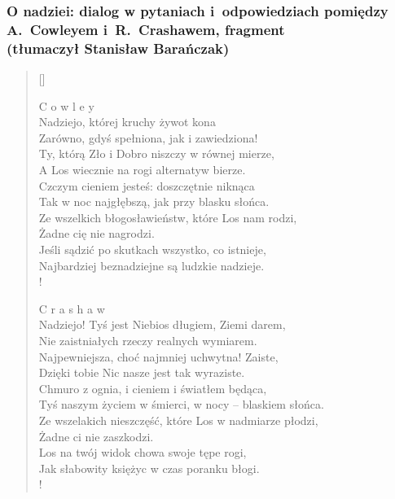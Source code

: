 \documentclass[10pt,t]{beamer}
\begin{document}
\begin{frame}
  \frametitle{O nadziei: dialog w pytaniach i~odpowiedziach pomiędzy \\
    A.~Cowleyem i~R.~Crashawem, fragment \\
    (tłumaczył Stanisław
    Barańczak)}

  \settowidth{\versewidth}{Zarówno, gdyś spełniona, jak i
    zawiedziona!} { \tiny
    \begin{verse}[\versewidth]
      \setlength{\vrightskip}{-10em} 

      C o w l e y \\
      \vin Nadziejo, której kruchy żywot kona \\
      Zarówno, gdyś spełniona, jak i zawiedziona! \\
      Ty, którą Zło i Dobro niszczy w równej mierze, \\
      A Los wiecznie na rogi alternatyw bierze. \\
      \vin Czczym cieniem jesteś: doszczętnie niknąca \\
      \vin Tak w noc najgłębszą, jak przy blasku słońca. \\
      \vin Ze wszelkich błogosławieństw, które Los nam rodzi, \\
      \vin\vin Żadne cię nie nagrodzi. \\
      Jeśli sądzić po skutkach wszystko, co istnieje, \\
      Najbardziej beznadziejne są ludzkie nadzieje. \\!

      C r a s h a w \\
      \vin Nadziejo! Tyś jest Niebios długiem, Ziemi darem, \\
      Nie zaistniałych rzeczy realnych wymiarem. \\
      Najpewniejsza, choć najmniej uchwytna! Zaiste, \\
      Dzięki tobie Nic nasze jest tak wyraziste. \\
      \vin Chmuro z ognia, i cieniem i światłem będąca, \\
      \vin Tyś naszym życiem w śmierci, w nocy -- blaskiem słońca. \\
      \vin Ze wszelakich nieszczęść, które Los w nadmiarze płodzi, \\
      \vin\vin Żadne ci nie zaszkodzi. \\
      Los na twój widok chowa swoje tępe rogi, \\
      Jak słabowity księżyc w czas poranku błogi. \\!

    \end{verse}
  }
\end{frame}
\end{document}
